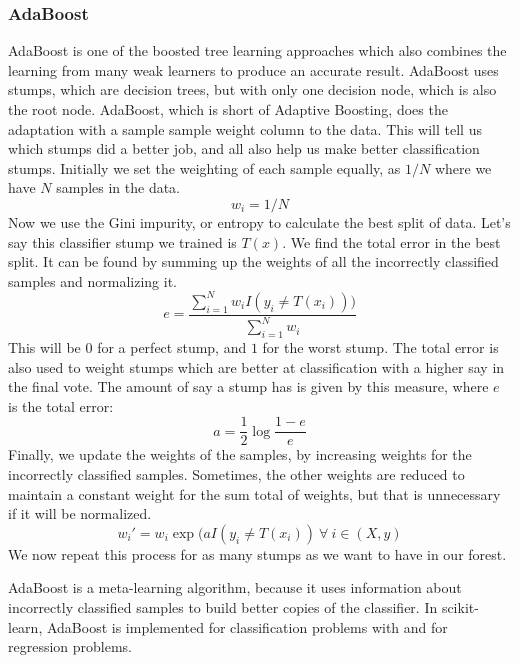 \documentclass{article}
\newcommand{\code}[1]{{\fontfamily{zi4} \selectfont{#1}}}
\begin{document}
\subsubsection{AdaBoost}
AdaBoost is one of the boosted tree learning approaches which also combines the learning from many weak learners to produce an accurate result. AdaBoost uses stumps, which are decision trees, but with only one decision node, which is also the root node. AdaBoost, which is short of Adaptive Boosting, does the adaptation with a sample sample weight column to the data. This will tell us which stumps did a better job, and all also help us make better classification stumps. Initially we set the weighting of each sample equally, as $1/N$ where we have $N$ samples in the data. 
$$w_i = 1/N$$
Now we use the Gini impurity, or entropy to calculate the best split of data. Let's say this classifier stump we trained is $T(x)$. We find the total error in the best split. It can be found by summing up the weights of all the incorrectly classified samples and normalizing it. 
$$e = \frac{\sum_{i=1}^N w_i I(y_i \neq T(x_i)))}{\sum_{i=1}^N w_i }$$
This will be $0$ for a perfect stump, and $1$ for the worst stump. The total error is also used to weight stumps which are better at classification with a higher say in the final vote. The amount of say a stump has is given by this measure, where $e$ is the total error:
$$a = \frac{1}{2} \log{\frac{1-e}{e}}$$
Finally, we update the weights of the samples, by increasing weights for the incorrectly classified samples. Sometimes, the other weights are reduced to maintain a constant weight for the sum total of weights, but that is unnecessary if it will be normalized. 
$$w_i' = w_i \exp{(a I(y_i \neq T(x_i))}\ \forall \ i \in (X, y)$$
We now repeat this process for as many stumps as we want to have in our forest.

AdaBoost is a meta-learning algorithm, because it uses information about incorrectly classified samples to build better copies of the classifier. In scikit-learn, AdaBoost is implemented for classification problems with \code{sklearn.ensemble.AdaBoostClassifier()} and \code{sklearn.ensemble.AdaBoostRegressor()} for regression problems.
\end{document}
